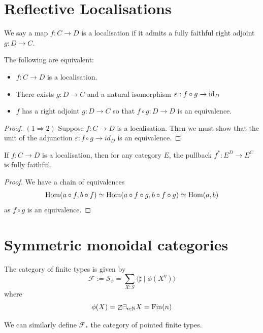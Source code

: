 \documentclass{article}
\newcommand{\cF}{\mathcal{F}}
\begin{document}
\section{Reflective Localisations}

\begin{definition}
  We say a map $f : C \to D$ is a localisation if it admits a fully faithful right adjoint $g : D \to C$.
\end{definition}

\begin{lemma}
  The following are equivalent:
  \begin{itemize}
    \item $f : C \to D$ is a localisation. 
    \item There exists $g : D \to C$ and a natural isomorphism $\varepsilon : f \circ g \to \mathrm{id}_D$
    \item $f$ has a right adjoint $g : D \to C$ so that $f \circ g : D \to D$ is an equivalence.
  \end{itemize}
\end{lemma}
\begin{proof}
  $(1 \Rightarrow 2)$ 
  Suppose $f : C \to D$ is a localisation. 
  Then we must show that the unit of the adjunction $\varepsilon : f \circ g \to id_D$ is an equivalence. 

\end{proof}

\begin{proposition}
  If $f : C \to D$ is a localisation, then for any category $E$, the pullback $f^* : E^D \to E^C$ is fully faithful.
\end{proposition}
\begin{proof}
  We have a chain of equivalences 
  \[ \operatorname{Hom}(a \circ f, b \circ f) \simeq \operatorname{Hom}(a \circ f \circ g, b \circ f \circ g) \simeq \operatorname{Hom}(a, b)\]
  as $f \circ g$ is an equivalence.
\end{proof}

\section{Symmetric monoidal categories}
\begin{definition}
  The category of finite types is given by 
  \[ \mathcal{F} := \mathcal{S}_\phi = \sum_{X : S} \langle \sharp \mid \phi(X^\eta)\rangle \]
  where 
  \[ \phi(X) = \boxslash \exists_{n : \mathbb{N}} X = \mathrm{Fin}(n) \]

  We can similarly define $\cF_\ast$ the category of pointed finite types.
\end{definition} 
\end{document}
